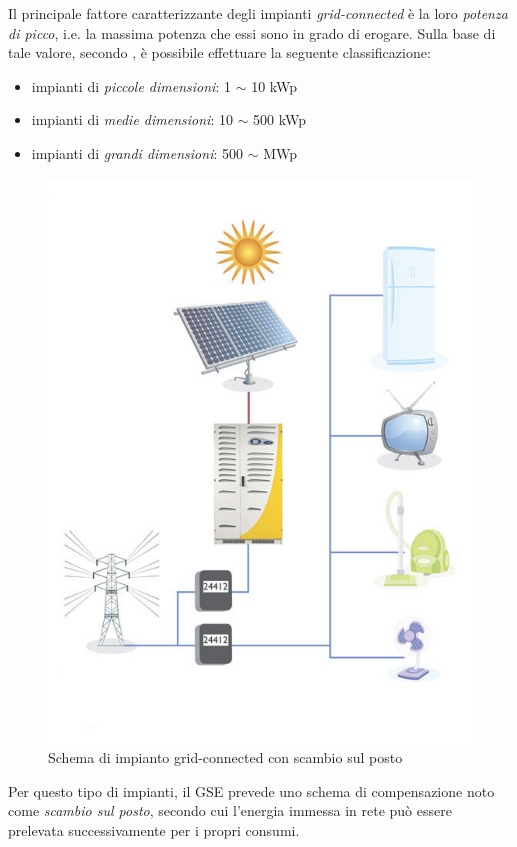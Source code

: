 %
Il principale fattore caratterizzante degli impianti \emph{grid-connected} \`e la loro
\emph{potenza di picco}, i.e. la massima potenza che essi sono in grado di 
erogare. Sulla base di tale valore, secondo \cite{castaner02}, \`e possibile effettuare 
la seguente classificazione:
%
\begin{itemize}
\item impianti di \emph{piccole dimensioni}: 1 $\sim$  10 kWp
\item impianti di \emph{medie dimensioni}: 10 $\sim$ 500 kWp
\item impianti di \emph{grandi dimensioni}: 500 $\sim$ MWp 
\end{itemize}
%
\begin{figure}[!h]
\centering
\includegraphics[width=350pt]{img/impianto-grid-connect.jpg}
\caption{Schema di impianto grid-connected con scambio sul posto}
\label{impiantogridconnect}
\end{figure}
%

%
Per questo tipo di impianti, il GSE prevede uno schema di compensazione 
noto come \emph{scambio sul posto}\cite{scambioposto}, secondo cui l'energia immessa 
in rete pu\`o essere prelevata successivamente per i propri consumi.
%

